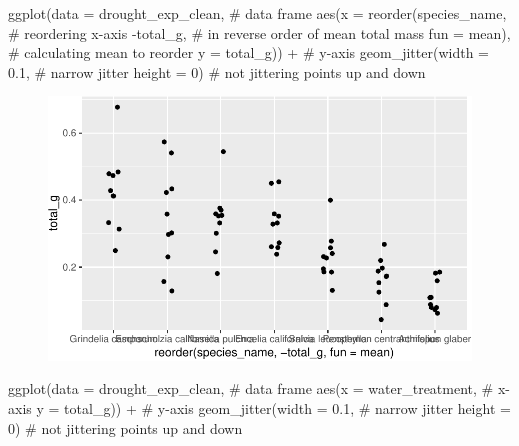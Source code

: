 \documentclass[
  letterpaper,
  DIV=11,
  numbers=noendperiod]{scrartcl}
\newenvironment{Shaded}{\begin{snugshade}}{\end{snugshade}}
\newcommand{\AttributeTok}[1]{\textcolor[rgb]{0.40,0.45,0.13}{#1}}
\newcommand{\CommentTok}[1]{\textcolor[rgb]{0.37,0.37,0.37}{#1}}
\newcommand{\DecValTok}[1]{\textcolor[rgb]{0.68,0.00,0.00}{#1}}
\newcommand{\FloatTok}[1]{\textcolor[rgb]{0.68,0.00,0.00}{#1}}
\newcommand{\FunctionTok}[1]{\textcolor[rgb]{0.28,0.35,0.67}{#1}}
\newcommand{\NormalTok}[1]{\textcolor[rgb]{0.00,0.23,0.31}{#1}}
\newcommand{\SpecialCharTok}[1]{\textcolor[rgb]{0.37,0.37,0.37}{#1}}
\begin{document}
\begin{Shaded}
\begin{Highlighting}[]
\FunctionTok{ggplot}\NormalTok{(}\AttributeTok{data =}\NormalTok{ drought\_exp\_clean, }\CommentTok{\# data frame}
       \FunctionTok{aes}\NormalTok{(}\AttributeTok{x =} \FunctionTok{reorder}\NormalTok{(species\_name, }\CommentTok{\# reordering x{-}axis}
                       \SpecialCharTok{{-}}\NormalTok{total\_g, }\CommentTok{\# in reverse order of mean total mass}
                       \AttributeTok{fun =}\NormalTok{ mean), }\CommentTok{\# calculating mean to reorder}
           \AttributeTok{y =}\NormalTok{ total\_g)) }\SpecialCharTok{+} \CommentTok{\# y{-}axis}
  \FunctionTok{geom\_jitter}\NormalTok{(}\AttributeTok{width =} \FloatTok{0.1}\NormalTok{, }\CommentTok{\# narrow jitter}
              \AttributeTok{height =} \DecValTok{0}\NormalTok{) }\CommentTok{\# not jittering points up and down}
\end{Highlighting}
\end{Shaded}

\begin{figure}[H]

{\centering \includegraphics{Odile_Gabbiani_homework-03_files/figure-pdf/unnamed-chunk-4-1.pdf}

}

\end{figure}

\begin{Shaded}
\begin{Highlighting}[]
\FunctionTok{ggplot}\NormalTok{(}\AttributeTok{data =}\NormalTok{ drought\_exp\_clean, }\CommentTok{\# data frame}
       \FunctionTok{aes}\NormalTok{(}\AttributeTok{x =}\NormalTok{ water\_treatment, }\CommentTok{\# x{-}axis}
           \AttributeTok{y =}\NormalTok{ total\_g)) }\SpecialCharTok{+} \CommentTok{\# y{-}axis}
  \FunctionTok{geom\_jitter}\NormalTok{(}\AttributeTok{width =} \FloatTok{0.1}\NormalTok{, }\CommentTok{\# narrow jitter}
              \AttributeTok{height =} \DecValTok{0}\NormalTok{) }\CommentTok{\# not jittering points up and down}
\end{Highlighting}
\end{Shaded}
\end{document}
